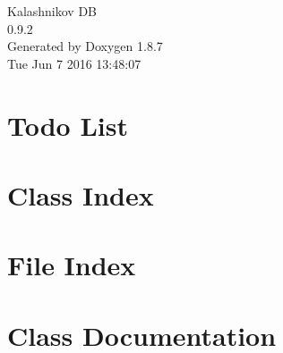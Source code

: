 \documentclass[twoside]{book}
\newcommand{\+}{\discretionary{\mbox{\scriptsize$\hookleftarrow$}}{}{}}
\newcommand{\clearemptydoublepage}{%
  \newpage{\pagestyle{empty}\cleardoublepage}%
}
\begin{document}
\hypersetup{pageanchor=false,
             bookmarks=true,
             bookmarksnumbered=true,
             pdfencoding=unicode
            }
\begin{titlepage}
\vspace*{7cm}
\begin{center}%
{\Large Kalashnikov D\+B \\[1ex]\large 0.\+9.\+2 }\\
\vspace*{1cm}
{\large Generated by Doxygen 1.8.7}\\
\vspace*{0.5cm}
{\small Tue Jun 7 2016 13:48:07}\\
\end{center}
\end{titlepage}
\clearemptydoublepage
\tableofcontents
\clearemptydoublepage
{}
\hypersetup{pageanchor=true}

\chapter{Todo List}
\label{todo}
\hypertarget{todo}{}

\chapter{Class Index}

\chapter{File Index}

\chapter{Class Documentation}













































\end{document}
